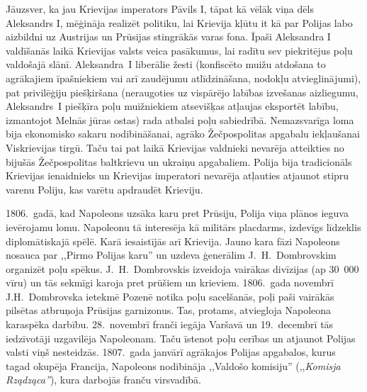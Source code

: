 \documentclass[twoside,a5paper,12pt,fleqn,openany]{extbook}
\newcommand{\asterism}{\vspace{1em}{\centering\Large\bfseries$\ast~\ast~\ast$\par}\vspace{1em}}
\newcommand{\pltxti}[1]{\textit{\textpolish{#1}}}
\begin{document}
Jāuzsver, ka jau Krievijas imperators Pāvils I, tāpat kā vēlāk viņa dēls Aleksandrs I, mēģināja realizēt politiku, lai Krievija kļūtu it kā par Polijas labo aizbildni uz Austrijas un Prūsijas stingrākās varas fona. Īpaši Aleksandra I valdīšanās laikā Krievijas valsts veica pasākumus, lai radītu sev piekritējus poļu valdošajā slānī. Aleksandra~I liberālie žesti (konfiscēto muižu atdošana to agrākajiem īpašniekiem vai arī zaudējumu atlīdzināšana, nodokļu atvieglinājumi), pat privilēģiju piešķiršana (neraugoties uz vispārējo labības izvešanas aizliegumu, Aleksandrs~I piešķīra poļu muižniekiem atsevišķas atļaujas eksportēt labību, izmantojot Melnās jūras ostas) rada atbalsi poļu sabiedrībā. Nemazsvarīga loma bija ekonomisko sakaru nodibināšanai, agrāko Žečpospolitas apgabalu iekļaušanai Viskrievijas tirgū. Taču tai pat laikā Krievijas valdnieki nevarēja atteikties no bijušās Žečpospolitas baltkrievu un ukraiņu apgabaliem. Polija bija tradicionāls Krievijas ienaidnieks un Krievijas imperatori nevarēja atļauties atjaunot stipru varenu Poliju, kas varētu apdraudēt Krieviju.

\asterism

1806.~gadā, kad Napoleons uzsāka karu pret Prūsiju, Polija viņa plānos ieguva ievērojamu lomu. Napoleonu tā interesēja kā militārs placdarms, izdevīgs līdzeklis diplomātiskajā spēlē. Karā iesaistījās arī Krievija. Jauno kara fāzi Napoleons nosauca par ,,Pirmo Polijas karu'' un uzdeva ģenerālim J.~H.~Dombrovskim organizēt poļu spēkus. J.~H.~Dombrovskis izveidoja vairākas divīzijas (ap 30~000 vīru) un tās sekmīgi karoja pret prūšiem un krieviem. 1806.~gada novembrī J.H.~Dombrovska ietekmē Pozenē notika poļu sacelšanās, poļi paši vairākās pilsētas atbruņoja Prūsijas garnizonus. Tas, protams, atviegloja Napoleona karaspēka darbību. 28.~novembrī franči iegāja Varšavā un 19.~decembrī tās iedzīvotāji uzgavilēja Napoleonam. Taču īstenot poļu cerības un atjaunot Polijas valsti viņš nesteidzās. 1807.~gada janvārī agrākajos Polijas apgabalos, kurus tagad okupēja Francija, Napoleons nodibināja ,,Valdošo komisiju'' (,,\pltxti{Komisja Rządząca''}), kura darbojās franču virsvadībā.
\end{document}

